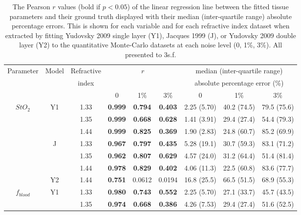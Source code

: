 \begin{table}[htb!]
    \centering
    \caption{The Pearson $r$ values (bold if $p<0.05$) of the linear regression line between the fitted tissue parameters and their ground truth displayed with their median (inter-quartile range) absolute percentage errors. This is shown for each variable and for each refractive index dataset when extracted by fitting Yudovsky 2009 single layer (Y1), Jacques 1999 (J), or Yudovsky 2009 double layer (Y2) to the quantitative Monte-Carlo datasets at each noise level (0, 1\%, 3\%). All presented to 3s.f.}
    \begin{tabular}{|ccc|ccc|ccc|}
        \hline
        Parameter & Model & Refractive & \multicolumn{3}{c}{$r$} & \multicolumn{3}{|c|}{median (inter-quartile range)} \\
        & & index & \multicolumn{3}{c}{} & \multicolumn{3}{|c|}{absolute percentage error (\%)} \\
        & & & 0 & 1\% & 3\% & 0 & 1\% & 3\% \\
        \hline
        \multirow{7}{*}{$StO_2$} & \multirow{3}{*}{Y1} & 1.33 & \textbf{0.999} & \textbf{0.794} & \textbf{0.403} & 2.25 (5.70) & 40.2 (74.5) & 79.5 (75.6) \\
        & & 1.35 & \textbf{0.999} & \textbf{0.668} & \textbf{0.628} & 1.41 (3.91) & 29.4 (27.4) & 54.4 (79.3) \\
        & & 1.44 & \textbf{0.999} & \textbf{0.825} & \textbf{0.369} & 1.90 (2.83) & 24.8 (60.7) & 85.2 (69.9) \\
        \cline{2-9}
        & \multirow{3}{*}{J} & 1.33 & \textbf{0.967} & \textbf{0.797} & \textbf{0.435} & 5.28 (19.1) & 30.7 (59.3) & 83.1 (71.2) \\
        & & 1.35 & \textbf{0.962} & \textbf{0.807} & \textbf{0.629} & 4.57 (24.0) & 31.2 (64.4) & 51.4 (81.4) \\
        & & 1.44 &  \textbf{0.978} & \textbf{0.829} & \textbf{0.402} & 4.06 (11.3) & 22.5 (60.8) & 83.6 (77.7) \\
        \cline{2-9}
        & Y2 & 1.44 & \textbf{0.751} & 0.0612 & 0.0194 & 16.8 (25.5) & 66.5 (51.5) & 68.9 (55.3) \\
        \hline
        \multirow{7}{*}{$f_{blood}$} & \multirow{3}{*}{Y1} & 1.33 & \textbf{0.980} & \textbf{0.743} & \textbf{0.552} & 2.25 (5.70) & 27.1 (33.7) & 45.7 (43.5) \\
        & & 1.35 & \textbf{0.974} & \textbf{0.668} & \textbf{0.386} & 4.26 (7.53) & 29.4 (27.4) & 51.6 (52.5) \\

\end{tabular}
\end{table}
